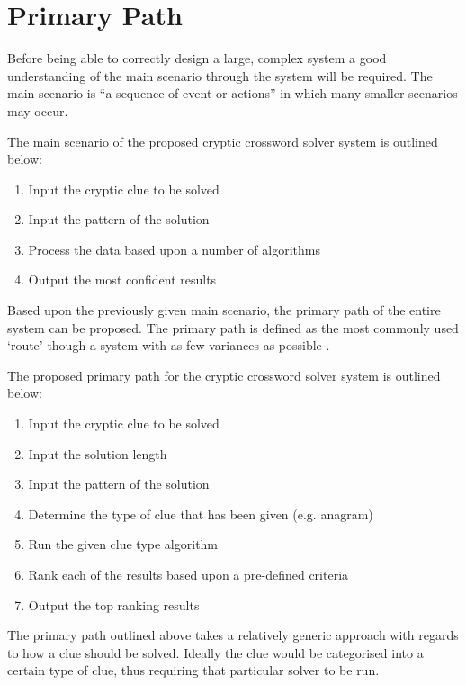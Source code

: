 \section{Primary Path}
\label{sec:primary_path}

Before being able to correctly design a large, complex system a good 
understanding of the main scenario through the system will be required. The main
scenario is ``a sequence of event or actions'' \citep{lunn03} in which many 
smaller scenarios may occur.

The main scenario of the proposed cryptic crossword solver system is outlined 
below:

\begin{enumerate}
  \item Input the cryptic clue to be solved
  \item Input the pattern of the solution
  \item Process the data based upon a number of algorithms
  \item Output the most confident results
\end{enumerate}

Based upon the previously given main scenario, the primary path of the entire 
system can be proposed. The primary path is defined as the most commonly used 
`route' though a system with as few variances as possible \citep{lunn03}.

The proposed primary path for the cryptic crossword solver system is outlined 
below:

\begin{enumerate}
  \item Input the cryptic clue to be solved
  \item Input the solution length
  \item Input the pattern of the solution
  \item Determine the type of clue that has been given (e.g. anagram)
  \item Run the given clue type algorithm 
  \item Rank each of the results based upon a pre-defined criteria
  \item Output the top ranking results
\end{enumerate}

The primary path outlined above takes a relatively generic approach with regards
to how a clue should be solved. Ideally the clue would be categorised into a 
certain type of clue, thus requiring that particular solver to be run.


